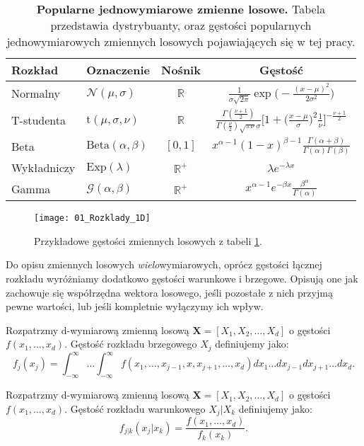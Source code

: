 \begin{table}[h]
	\caption{\textbf{Popularne jednowymiarowe zmienne losowe.} Tabela przedstawia dystrybuanty, oraz gęstości popularnych jednowymiarowych zmiennych losowych pojawiających się w tej pracy.}
	\label{tab:przykladowe_zmienne_losowe}
	\centering
	\begin{tabular}{ll|c|c}
		\hline
		\textbf{Rozkład} & \textbf{Oznaczenie} & \textbf{Nośnik} & \textbf{Gęstość} \\
		\hline
		Normalny & $\mathcal{N}(\mu, \sigma)$ & $\mathbb{R}$ & $\frac{1}{\sigma \sqrt{2 \pi}} \exp\big(-\frac{(x-\mu)^2}{2\sigma^2}\big)$\\ 
		T-studenta & $\text{t}(\mu, \sigma, \nu)$ & $\mathbb{R}$ & $ \frac{\Gamma(\frac{\nu + 1}{2})}{\Gamma(\frac{\nu}{2})\sqrt{\pi\nu}\sigma} \bigg[1 + \big(\frac{x - \mu}{\sigma}\big)^2\frac{1}{\nu}\bigg]^{-\frac{\nu + 1}{2}} $ \\ 
		Beta & $\text{Beta}(\alpha, \beta)$ & $[0, 1]$ & $ x^{\alpha - 1}(1 - x)^{\beta - 1}\frac{\Gamma(\alpha + \beta)}{\Gamma(\alpha)\Gamma(\beta)}$ \\ 
		Wykładniczy & $\text{Exp}(\lambda)$ & $\mathbb{R}^{+}$ & $ \lambda e^{-\lambda x}$ \\
		Gamma & $\mathcal{G}(\alpha, \beta)$ & $\mathbb{R}^+$ & $x^{\alpha - 1}e^{-\beta x}\frac{\beta^\alpha}{\Gamma(\alpha)}$\\ 
		
		\hline
	\end{tabular}
\end{table}

\begin{figure}[H]
	\centering
	\texttt{[image: 01\_Rozklady\_1D]}
	\caption{Przykładowe gęstości zmiennych losowych z tabeli \ref{tab:przykladowe_zmienne_losowe}.\label{fig:przykladowe_zmienne_losowe}}
\end{figure}

Do opisu zmiennych losowych \emph{wielo}wymiarowych, oprócz gęstości łącznej rozkładu wyróżniamy dodatkowo gęstości warunkowe i brzegowe. Opisują one jak zachowuje się współrzędna wektora losowego, jeśli pozostałe z nich przyjmą pewne wartości, lub jeśli kompletnie wyłączymy ich wpływ.

\begin{df}
	Rozpatrzmy d-wymiarową zmienną losową $\mathbf{X} = [X_1, X_2, \dots, X_d]$ o gęstości $f(x_1, \dots, x_d)$. Gęstość rozkładu brzegowego $X_j$ definiujemy jako:
	$$f_j(x_j)=\int_{-\infty}^{\infty}\dots\int_{-\infty}^{\infty} f(x_1, \dots, x_{j-1}, x, x_{j+1}, \dots, x_d)  dx_1\dots dx_{j-1} dx_{j+1} \dots dx_d.$$
\end{df}

\begin{df}
	Rozpatrzmy d-wymiarową zmienną losową $\mathbf{X} = [X_1, X_2, \dots, X_d]$ o gęstości $f(x_1, \dots, x_d)$. Gęstość rozkładu warunkowego $X_j \vert X_k$ definiujemy jako:
	$$f_{j|k}(x_j|x_k) = \frac{f(x_1, \dots, x_d)}{f_k(x_k)}.$$
\end{df}
